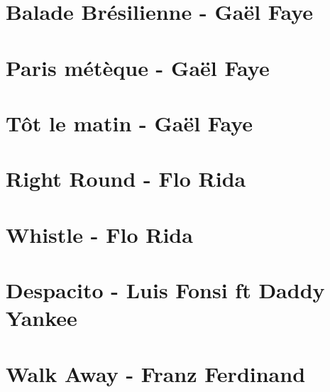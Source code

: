 \documentclass[11pt]{article}
\begin{document}
\section{Balade Brésilienne - Gaël Faye}
\begin{guitar}

\end{guitar}


\section{Paris métèque - Gaël Faye}
\begin{guitar}

\end{guitar}


\section{Tôt le matin - Gaël Faye}
\begin{guitar}

\end{guitar}

\section{Right Round - Flo Rida}
\begin{guitar}

\end{guitar}


\section{Whistle - Flo Rida}
\begin{guitar}

\end{guitar}

\section{Despacito - Luis Fonsi ft Daddy Yankee}





\section{Walk Away - Franz Ferdinand}
\begin{guitar}

\end{guitar}
\end{document}
